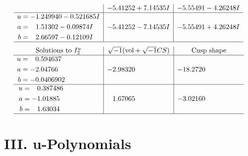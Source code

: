 \documentclass[1p]{elsarticle_modified}
\theoremstyle{definition}
\newcommand{\I}{\sqrt{-1}}
\begin{document}
$$\begin{array}{c|c|c}
 & -5.41252 + 7.14535 I & -5.55491 - 4.26248 I \\ \hline\begin{aligned}
u &= -1.249940 - 0.521685 I \\
a &= \phantom{-}1.51302 - 0.09874 I \\
b &= \phantom{-}2.66597 - 0.12109 I\end{aligned}
 & -5.41252 - 7.14535 I & -5.55491 + 4.26248 I\\
 \hline 
 \end{array}$$\newpage$$\begin{array}{c|c|c}  
\text{Solutions to }I^u_{2}& \I (\text{vol} + \sqrt{-1}CS) & \text{Cusp shape}\\
 \hline 
\begin{aligned}
u &= \phantom{-}0.594637\phantom{ +0.000000I} \\
a &= -2.04766\phantom{ +0.000000I} \\
b &= -0.0406902\phantom{ +0.000000I}\end{aligned}
 & -2.98320\phantom{ +0.000000I} & -18.2720\phantom{ +0.000000I} \\ \hline\begin{aligned}
u &= \phantom{-}0.387486\phantom{ +0.000000I} \\
a &= -1.01885\phantom{ +0.000000I} \\
b &= \phantom{-}1.63034\phantom{ +0.000000I}\end{aligned}
 & \phantom{-}1.67065\phantom{ +0.000000I} & -3.02160\phantom{ +0.000000I}\\
 \hline 
 \end{array}$$\newpage
\newpage\renewcommand{\arraystretch}{1}
\centering \section*{ III. u-Polynomials}
\end{document}
